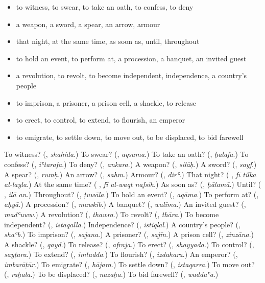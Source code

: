 \begin{itemize}
\raggedright
  \item to witness, to swear, to take an oath, to confess, to deny
  \item a weapon, a sword, a spear, an arrow, armour
  \item that night, at the same time, as soon as, until, throughout
  \item to hold an event, to perform at, a procession, a banquet, an invited guest
  \item a revolution, to revolt, to become independent, independence, a country’s people
  \item to imprison, a prisoner, a prison cell, a shackle, to release
  \item to erect, to control, to extend, to flourish, an emperor
  \item to emigrate, to settle down, to move out, to be displaced, to bid farewell
\end{itemize}

\begin{tcolorbox}[breakable,colback=teal!4,colframe=teal!35!black,title={Before you move on}]
To witness? (\textbf{}, \emph{shahida}.) To swear? (\textbf{}, \emph{aqsama}.) To take an oath? (\textbf{}, \emph{ḥalafa}.) To confess? (\textbf{}, \emph{iʿtarafa}.) To deny? (\textbf{}, \emph{ankara}.) A weapon? (\textbf{}, \emph{silāḥ}.) A sword? (\textbf{}, \emph{sayf}.) A spear? (\textbf{}, \emph{rumḥ}.) An arrow? (\textbf{}, \emph{sahm}.) Armour? (\textbf{}, \emph{dirʿ}.) That night? (\textbf{  }, \emph{fī tilka al-layla}.) At the same time? (\textbf{  }, \emph{fī al-waqt nafsih}.) As soon as? (\textbf{}, \emph{ḥālamā}.) Until? (\textbf{ }, \emph{ilā an}.) Throughout? (\textbf{}, \emph{ṭuwāla}.) To hold an event? (\textbf{}, \emph{aqāma}.) To perform at? (\textbf{}, \emph{aḥyā}.) A procession? (\textbf{}, \emph{mawkib}.) A banquet? (\textbf{}, \emph{walīma}.) An invited guest? (\textbf{}, \emph{madʿuww}.) A revolution? (\textbf{}, \emph{thawra}.) To revolt? (\textbf{}, \emph{thāra}.) To become independent? (\textbf{}, \emph{istaqalla}.) Independence? (\textbf{}, \emph{istiqlāl}.) A country’s people? (\textbf{}, \emph{shaʿb}.) To imprison? (\textbf{}, \emph{sajana}.) A prisoner? (\textbf{}, \emph{sajīn}.) A prison cell? (\textbf{}, \emph{zinzāna}.) A shackle? (\textbf{}, \emph{qayd}.) To release? (\textbf{}, \emph{afraja}.) To erect? (\textbf{}, \emph{shayyada}.) To control? (\textbf{}, \emph{sayṭara}.) To extend? (\textbf{}, \emph{imtadda}.) To flourish? (\textbf{}, \emph{izdahara}.) An emperor? (\textbf{}, \emph{imbarāṭūr}.) To emigrate? (\textbf{}, \emph{hājara}.) To settle down? (\textbf{}, \emph{istaqarra}.) To move out? (\textbf{}, \emph{raḥala}.) To be displaced? (\textbf{}, \emph{nazaḥa}.) To bid farewell? (\textbf{}, \emph{waddaʿa}.)
\end{tcolorbox}
